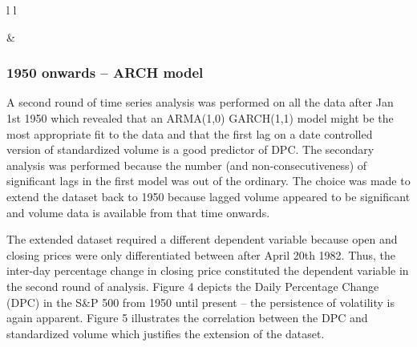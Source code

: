 \documentclass[11pt,preprint, authoryear]{elsarticle}
\let\origtable\table
\let\endorigtable\endtable
\renewenvironment{table}[1][2] {
    \expandafter\origtable\expandafter[H]
} {
    \endorigtable
}
\numberwithin{equation}{section}
\numberwithin{figure}{section}
\numberwithin{table}{section}
\begin{document}
\begin{table}[ht]
\begin{centerbox}
\begin{threeparttable}
\begin{tabular}{l l}
\hhline{}

 &
 \tabularnewline[-0.5pt]



 \tabularnewline[-0.5pt]


\hhline{}
\end{tabular}
\end{threeparttable}\par\end{centerbox}

\end{table}
 

\hypertarget{onwards-arch-model}{%
\subsubsection{1950 onwards -- ARCH model}\label{onwards-arch-model}}

A second round of time series analysis was performed on all the data
after Jan 1st 1950 which revealed that an ARMA(1,0) GARCH(1,1) model
might be the most appropriate fit to the data and that the first lag on
a date controlled version of standardized volume is a good predictor of
DPC. The secondary analysis was performed because the number (and
non-consecutiveness) of significant lags in the first model was out of
the ordinary. The choice was made to extend the dataset back to 1950
because lagged volume appeared to be significant and volume data is
available from that time onwards.

The extended dataset required a different dependent variable because
open and closing prices were only differentiated between after April
20th 1982. Thus, the inter-day percentage change in closing price
constituted the dependent variable in the second round of analysis.
Figure 4 depicts the Daily Percentage Change (DPC) in the S\&P 500 from
1950 until present -- the persistence of volatility is again apparent.
Figure 5 illustrates the correlation between the DPC and standardized
volume which justifies the extension of the dataset.
\end{document}
